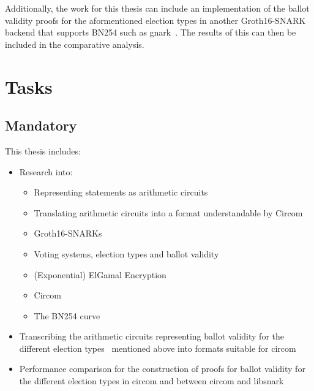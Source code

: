 \documentclass[12pt]{article}
\begin{document}
Additionally, the work for this thesis can include an implementation of the ballot validity proofs for the aformentioned election types in another Groth16-SNARK backend that supports BN254 such as gnark~\cite{gnark}.
The results of this can then be included in the comparative analysis.

\section{Tasks}
\subsection{Mandatory}
This thesis includes:
\begin{itemize}
    \item Research into:
    \begin{itemize}
        \item Representing statements as arithmetic circuits
        \item Translating arithmetic circuits into a format understandable by Circom~\cite{lambdaclass, circom, MoonMath}
        \item Groth16-SNARKs~\cite{MoonMath}
        \item Voting systems, election types and ballot validity
        \item (Exponential) ElGamal Encryption
        \item Circom~\cite{circom}
        \item The BN254 curve
    \end{itemize} 
    \item Transcribing the arithmetic circuits representing ballot validity for the different election types~\cite{BallotSnarks} mentioned above into formats suitable for circom
    \item Performance comparison for the construction of proofs for ballot validity for the different election types in circom and between circom and libsnark
\end{itemize}
\end{document}
